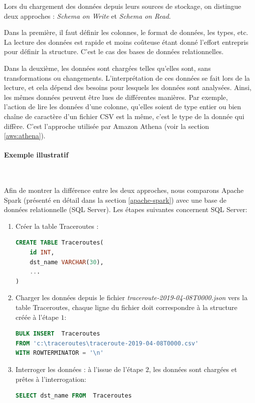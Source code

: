 		Lors du chargement des données depuis leurs sources de stockage, on distingue deux approches : \textit{ Schema on Write} et \textit{Schema on Read}.
		
		Dans la première, il faut définir les colonnes, le format de données, les types, etc. La lecture des données est rapide et moins coûteuse étant donné l'effort entrepris pour définir la structure. C'est le cas des bases de données relationnelles.
		
		Dans la deuxième, les données sont chargées telles qu'elles sont, sans transformations ou changements. L'interprétation de ces données se fait lors de la lecture, et cela dépend des besoins pour lesquels les données sont analysées. Ainsi, les mêmes données peuvent être lues de différentes manières. Par exemple, l'action  de lire les données  d'une colonne, qu'elles soient de type entier ou bien chaîne de caractère d'un fichier CSV est la même, c'est le type de la donnée qui diffère. C'est l'approche utilisée par Amazon Athena (voir la section \ref{aws:athena}). 
		
\paragraph{Exemple illustratif}~

 Afin de montrer la différence entre les deux approches, nous comparons Apache Spark (présenté en détail dans la section \ref{apache-spark}) avec une base de données relationnelle (SQL Server).   Les étapes suivantes concernent  SQL Server:
\begin{enumerate}
	\item Créer la table Traceroutes :
\begin{lstlisting}[language = sql, basicstyle=\small]
CREATE TABLE Traceroutes(
	id INT,
	dst_name VARCHAR(30),
	...
)
\end{lstlisting}
		
	\item  Charger les données depuis le fichier \textit{traceroute-2019-04-08T0000.json} vers la table Traceroutes, chaque ligne du fichier doit correspondre à la  structure  créée à l'étape $ 1 $:
\begin{lstlisting}[language = sql, basicstyle=\small]
BULK INSERT  Traceroutes
FROM 'c:\traceroutes\traceroute-2019-04-08T0000.csv'
WITH ROWTERMINATOR = '\n'
\end{lstlisting}
	
	\item Interroger les données : à l'issue de l'étape $2$,  les données sont chargées et prêtes à l'interrogation: 
\begin{lstlisting}[language = sql, basicstyle=\small]
SELECT dst_name FROM  Traceroutes
\end{lstlisting}
	\end{enumerate}

